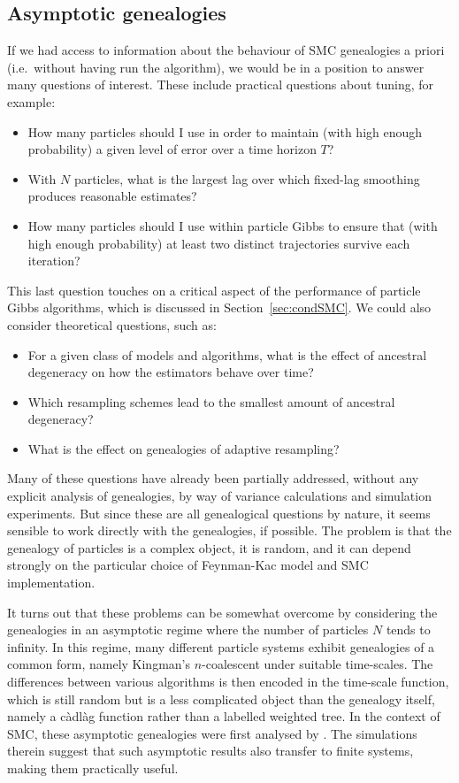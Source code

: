 \subsection{Asymptotic genealogies}
If we had access to information about the behaviour of SMC genealogies a priori (i.e.\ without having run the algorithm), we would be in a position to answer many questions of interest. These include practical questions about tuning, for example:
\begin{itemize}
\item How many particles should I use in order to maintain (with high enough probability) a given level of error over a time horizon $T$?
\item With $N$ particles, what is the largest lag over which fixed-lag smoothing produces reasonable estimates?
\item How many particles should I use within particle Gibbs to ensure that (with high enough probability) at least two distinct trajectories survive each iteration?
\end{itemize}
This last question touches on a critical aspect of the performance of particle Gibbs algorithms, which is discussed in Section~\ref{sec:condSMC}.
We could also consider theoretical questions, such as:
\begin{itemize}
\item For a given class of models and algorithms, what is the effect of ancestral degeneracy on how the estimators behave over time?
\item Which resampling schemes lead to the smallest amount of ancestral degeneracy?
\item What is the effect on genealogies of adaptive resampling?
\end{itemize}
Many of these questions have already been partially addressed, without any explicit analysis of genealogies, by way of variance calculations and simulation experiments.
But since these are all genealogical questions by nature, it seems sensible to work directly with the genealogies, if possible.
The problem is that the genealogy of particles is a complex object, it is random, and it can depend strongly on the particular choice of Feynman-Kac model and SMC implementation.

It turns out that these problems can be somewhat overcome by considering the genealogies in an asymptotic regime where the number of particles $N$ tends to infinity.
In this regime, many different particle systems exhibit genealogies of a common form, namely Kingman's $n$-coalescent under suitable time-scales. The differences between various algorithms is then encoded in the time-scale function, which is still random but is a less complicated object than the genealogy itself, namely a c\`adl\`ag function rather than a labelled weighted tree.
In the context of SMC, these asymptotic genealogies were first analysed by \textcite{koskela2018}. The simulations therein suggest that such asymptotic results also transfer to finite systems, making them practically useful.

